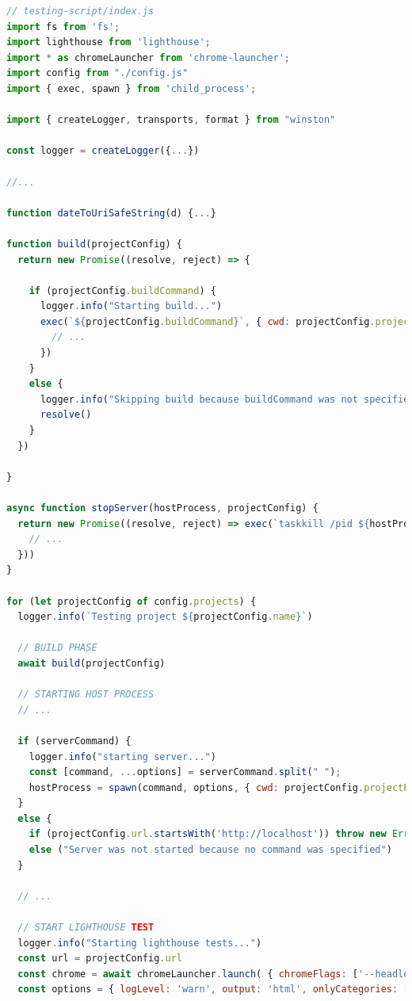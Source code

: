 \documentclass[a4paper, 12pt]{article}
\begin{document}
\vspace{1cm}
\begin{lstlisting}[caption={Automation script for Lighthouse tests}, language=JavaScript, label={lst:lighthouse-script}]
// testing-script/index.js
import fs from 'fs';
import lighthouse from 'lighthouse';
import * as chromeLauncher from 'chrome-launcher';
import config from "./config.js"
import { exec, spawn } from 'child_process';

import { createLogger, transports, format } from "winston"

const logger = createLogger({...})

//...

function dateToUriSafeString(d) {...}

function build(projectConfig) {
  return new Promise((resolve, reject) => {

    if (projectConfig.buildCommand) {
      logger.info("Starting build...")
      exec(`${projectConfig.buildCommand}`, { cwd: projectConfig.projectPath, maxBuffer: 1024 * 1024 * 1024 }, (error, stdout, stderr) => {
        // ...
      })
    }
    else {
      logger.info("Skipping build because buildCommand was not specified")
      resolve()
    }
  })

}

async function stopServer(hostProcess, projectConfig) {
  return new Promise((resolve, reject) => exec(`taskkill /pid ${hostProcess.pid} /f /t`, (error, stdout, stderr) => {
    // ...
  }))
}

for (let projectConfig of config.projects) {
  logger.info(`Testing project ${projectConfig.name}`)

  // BUILD PHASE
  await build(projectConfig)

  // STARTING HOST PROCESS
  // ...

  if (serverCommand) {
    logger.info("starting server...")
    const [command, ...options] = serverCommand.split(" ");
    hostProcess = spawn(command, options, { cwd: projectConfig.projectPath, shell: true })
  }
  else {
    if (projectConfig.url.startsWith('http://localhost')) throw new Error("Server was not properly configured. Check prefferedServeCommand, hostCommand and/or serveCommand for project", projectConfig.name)
    else ("Server was not started because no command was specified")
  }

  // ...

  // START LIGHTHOUSE TEST
  logger.info("Starting lighthouse tests...")
  const url = projectConfig.url
  const chrome = await chromeLauncher.launch( { chromeFlags: ['--headless'] } );
  const options = { logLevel: 'warn', output: 'html', onlyCategories: ['performance'], port: chrome.port, ignoreStatusCode: true };


\end{lstlisting}
\end{document}
